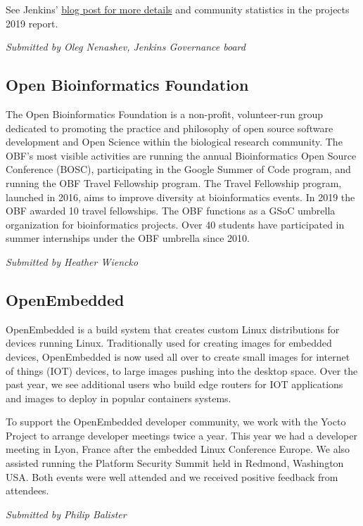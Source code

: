 \documentclass[a4paper]{report}
\begin{document}
See Jenkins'
\href{https://jenkins.io/blog/2020/01/07/happy-new-year/}{blog post for
more details} and community statistics in the projects 2019 report.

{\em Submitted by Oleg Nenashev, Jenkins Governance board}

\subsection{Open Bioinformatics Foundation}

The Open Bioinformatics Foundation is a non-profit, volunteer-run group
dedicated to promoting the practice and philosophy of open source
software development and Open Science within the biological research
community. The OBF’s most visible activities are running the annual
Bioinformatics Open Source Conference (BOSC), participating in the
Google Summer of Code program, and running the OBF Travel Fellowship
program. The Travel Fellowship program, launched in 2016, aims to
improve diversity at bioinformatics events. In 2019 the OBF awarded 10
travel fellowships. The OBF functions as a GSoC umbrella organization
for bioinformatics projects.  Over 40 students have participated in
summer internships under the OBF umbrella since 2010.

{\em Submitted by Heather Wiencko}

\subsection{OpenEmbedded}

OpenEmbedded is a build system that creates custom Linux distributions
for devices running Linux. Traditionally used for creating images for
embedded devices, OpenEmbedded is now used all over to create small
images for internet of things (IOT) devices, to large images pushing
into the desktop space.  Over the past year, we see additional users who
build edge routers for IOT applications and images to deploy in popular
containers systems.

To support the OpenEmbedded developer community, we work with the Yocto
Project to arrange developer meetings twice a year. This year we had a
developer meeting in Lyon, France after the embedded Linux Conference
Europe. We also assisted running the Platform Security Summit held in
Redmond, Washington USA. Both events were well attended and we received
positive feedback from attendees.

{\em Submitted by Philip Balister}
\end{document}
